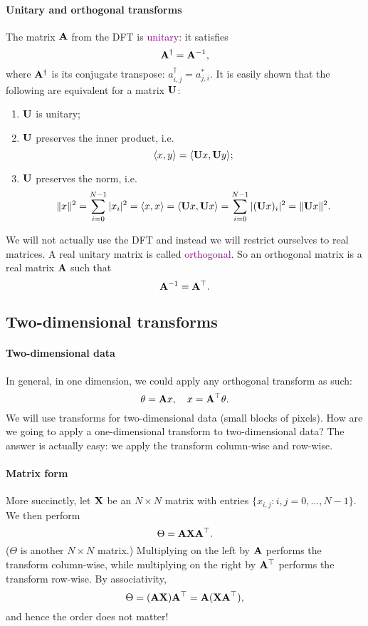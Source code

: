 \documentclass[a4paper, 11pt, openany]{book}
\numberwithin{equation}{section}
\theoremstyle{plain}
\theoremstyle{definition}
\newcommand{\Define}[1]{\textcolor{purple}{#1}}
\begin{document}
\paragraph{Unitary and orthogonal transforms}
The matrix ${\bf A}$ from the DFT is \Define{unitary}: it satisfies
\[
    {\bf A}^\dagger = {\bf A}^{-1},
\]
where ${\bf A}^\dagger$ is its conjugate transpose: $a^\dagger_{i,j} = a_{j,i}^*$. It is easily shown that the following are equivalent for a matrix ${\bf U}$:
\begin{enumerate}
    \item ${\bf U}$ is unitary;
    
    \item ${\bf U}$ preserves the inner product, i.e.
    \[
        \langle x,y \rangle = \langle {\bf U} x, {\bf U}y \rangle;
    \]

    \item ${\bf U}$ preserves the norm, i.e.
    \[
         \| x \|^2 = \sum_{i=0}^{N-1} |x_i|^2 = \langle x,x \rangle = \langle {\bf U} x, {\bf U}x \rangle = \sum_{i=0}^{N-1} |({\bf U}x)_i|^2 = \| {\bf U} x \|^2.
    \]
\end{enumerate}

We will not actually use the DFT and instead we will restrict ourselves to real matrices. A real unitary matrix is called \Define{orthogonal}. So an orthogonal matrix is a real matrix ${\bf A}$ such that 
\[
    {\bf A}^{-1} = {\bf A}^\top.
\]



\subsection{Two-dimensional transforms}

\paragraph{Two-dimensional data}
In general, in one dimension, we could apply any orthogonal transform as such:
\[
    \theta = {\bf A}x, \quad x = {\bf A}^\top \theta.
\]
We will use transforms for two-dimensional data (small blocks of pixels). How are we going to apply a one-dimensional transform to two-dimensional data? The answer is actually easy: we apply the transform column-wise and row-wise.

\paragraph{Matrix form} More succinctly, let ${\bf X}$ be an $N \times N$ matrix with entries $\{x_{i,j} : i,j = 0, \dots, N-1\}$. We then perform
\[
    \Theta = {\bf A} {\bf X} {\bf A}^\top.
\]
($\Theta$ is another $N \times N$ matrix.) Multiplying on the left by ${\bf A}$ performs the transform column-wise, while multiplying on the right by ${\bf A}^\top$ performs the transform row-wise. By associativity, 
\[
    \Theta = ({\bf A} {\bf X}) {\bf A}^\top = {\bf A} ( {\bf X} {\bf A}^\top ),
\]
and hence the order does not matter!
\end{document}
